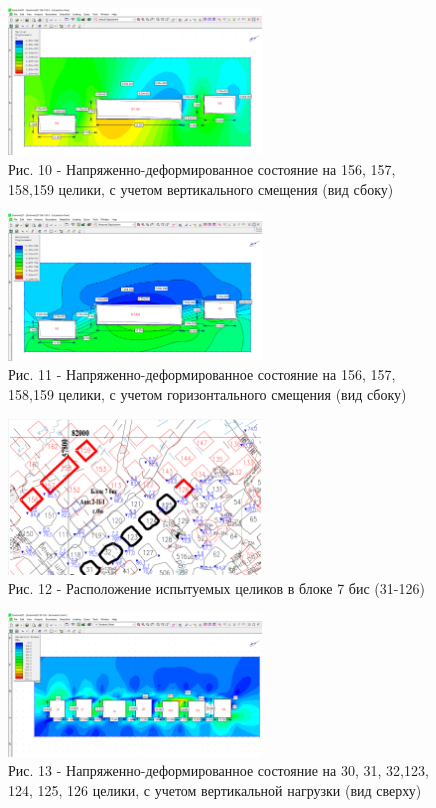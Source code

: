 \begin{figure}[H]
	\centering
	\includegraphics[width=0.6\textwidth]{media/gor/image14}
	\caption*{Рис. 10 - Напряженно-деформированное состояние на 156, 157,
	158,159 целики, с учетом вертикального смещения (вид сбоку)}
\end{figure}

\begin{figure}[H]
	\centering
	\includegraphics[width=0.6\textwidth]{media/gor/image15}
	\caption*{Рис. 11 - Напряженно-деформированное состояние на 156, 157,
	158,159 целики, с учетом горизонтального смещения (вид сбоку)}
\end{figure}

\begin{figure}[H]
	\centering
	\includegraphics[width=0.6\textwidth]{media/gor/image9}
	\caption*{Рис. 12 - Расположение испытуемых целиков в блоке 7 бис
	(31-126)}
\end{figure}

\begin{figure}[H]
	\centering
	\includegraphics[width=0.6\textwidth]{media/gor/image16}
	\caption*{Рис. 13 - Напряженно-деформированное состояние на 30, 31,
	32,123, 124, 125, 126 целики, с учетом вертикальной нагрузки (вид сверху)}
\end{figure}

